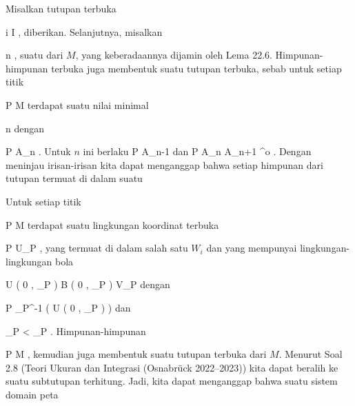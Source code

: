 {

\teilbeweis {}{}{}
{Misalkan tutupan terbuka

 {}
 {i \in I} {}
 {} {} {} {,}
diberikan. Selanjutnya, misalkan

 {}
 {n \in \N} {}
 {} {} {} {,}
suatu
dari $M$, yang keberadaannya dijamin oleh
Lema 22.6.
Himpunan-himpunan terbuka
 juga membentuk suatu tutupan terbuka, sebab untuk setiap titik

\mavergleichskette
{\vergleichskette
{ P
}
{ \in }{ M
}
{  }{
}
{    }{
}
{   }{
}
}
{}{}{}
terdapat suatu nilai minimal

\mavergleichskette
{\vergleichskette
{ n
}
{ \in }{ \N
}
{  }{
}
{    }{
}
{   }{
}
}
{}{}{}
dengan

\mavergleichskette
{\vergleichskette
{ P
}
{ \in }{ A_n
}
{  }{
}
{    }{
}
{   }{
}
}
{}{}{}
 {} {.}
Untuk $n$ ini berlaku
\mathkor {} {P \not\in A_{n-1}} {dan} {P \in A_n \subseteq A_{n+1} ^{o}} {.}
Dengan meninjau irisan-irisan
 kita dapat menganggap bahwa setiap himpunan dari tutupan termuat di dalam suatu
}
{}
\teilbeweis {}{}{}
{Untuk setiap titik

\mavergleichskette
{\vergleichskette
{ P
}
{ \in }{ M
}
{  }{
}
{    }{
}
{   }{
}
}
{}{}{}
terdapat suatu lingkungan koordinat terbuka
 {} {}

\mavergleichskette
{\vergleichskette
{ P
}
{ \in }{ U_P
}
{  }{
}
{    }{
}
{   }{
}
}
{}{}{,}
yang termuat di dalam salah satu $W_i$ dan yang mempunyai lingkungan-lingkungan bola

\mavergleichskettedisp
{\vergleichskette
{ U \left(   0 , \delta_P   \right)
}
{ \subset} { B  \left(  0 , \epsilon_P  \right)
}
{ \subset} { V_P
}
{ } {
}
{ } {
}
}
{}{}{}
dengan

\mavergleichskette
{\vergleichskette
{ P
}
{ \in }{ \alpha_P^{-1} \left(  U \left(   0 , \delta_P   \right)  \right)
}
{  }{
}
{    }{
}
{   }{
}
}
{}{}{}
dan

\mavergleichskette
{\vergleichskette
{ \delta_P
}
{ < }{ \epsilon_P
}
{  }{
}
{    }{
}
{   }{
}
}
{}{}{.}
Himpunan-himpunan

 {}
 {P \in M} {}
 {} {} {} {,}
kemudian juga membentuk suatu tutupan terbuka dari $M$. Menurut
Soal 2.8 (Teori Ukuran dan Integrasi (Osnabrück 2022--2023))
kita dapat beralih ke suatu subtutupan terhitung. Jadi, kita dapat menganggap bahwa suatu sistem domain peta

}}
